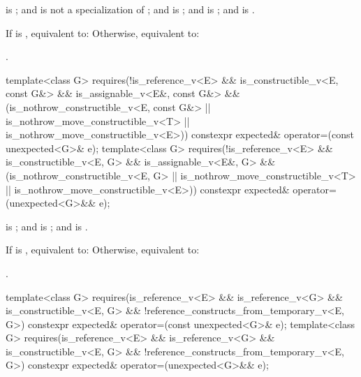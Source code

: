 \begin{itemdescr}
\pnum
\constraints
{} is ; and  is not a specialization of ; and  is ; and  is ; and  is .

\pnum
\effects
If  is , equivalent to:  Otherwise, equivalent to: 

\pnum
\returns
{}.
\end{itemdescr}

%
\begin{itemdecl}
template<class G>
  requires(!is_reference_v<E> && is_constructible_v<E, const G&> &&
           is_assignable_v<E&, const G&> &&
           (is_nothrow_constructible_v<E, const G&> ||
            is_nothrow_move_constructible_v<T> || is_nothrow_move_constructible_v<E>))
constexpr expected& operator=(const unexpected<G>& e);
template<class G>
  requires(!is_reference_v<E> && is_constructible_v<E, G> && is_assignable_v<E&, G> &&
           (is_nothrow_constructible_v<E, G> || is_nothrow_move_constructible_v<T> ||
            is_nothrow_move_constructible_v<E>))
constexpr expected& operator=(unexpected<G>&& e);
\end{itemdecl}

\begin{itemdescr}
\pnum
\constraints
{} is ; and  is ; and  is .

\pnum
\effects
If  is , equivalent to:  Otherwise, equivalent to: 

\pnum
\returns
{}.
\end{itemdescr}

%
\begin{itemdecl}
template<class G>
  requires(is_reference_v<E> && is_reference_v<G> && is_constructible_v<E, G> &&
           !reference_constructs_from_temporary_v<E, G>)
constexpr expected& operator=(const unexpected<G>& e);
template<class G>
  requires(is_reference_v<E> && is_reference_v<G> && is_constructible_v<E, G> &&
           !reference_constructs_from_temporary_v<E, G>)
constexpr expected& operator=(unexpected<G>&& e);
\end{itemdecl}

